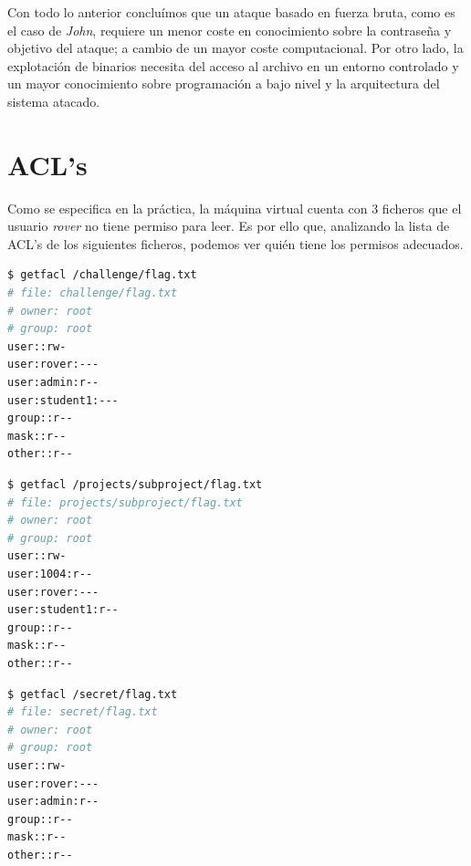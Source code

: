 \documentclass[]{article}
\begin{document}
Con todo lo anterior concluímos que un ataque basado en fuerza bruta, como es el caso de \textit{John}, requiere un menor coste en conocimiento sobre la contraseña y objetivo del ataque; a cambio de un mayor coste computacional. Por otro lado, la explotación de binarios necesita del acceso al archivo en un entorno controlado y un mayor conocimiento sobre programación a bajo nivel y la arquitectura del sistema atacado.

\section{ACL's}
\label{sec:acl}
Como se especifica en la práctica, la máquina virtual cuenta con 3 ficheros que el usuario \textit{rover} no tiene permiso para leer. Es por ello que, analizando la lista de ACL's de los siguientes ficheros, podemos ver quién tiene los permisos adecuados.

\vspace{0.5cm}

\begin{minipage}{\textwidth}
\begin{minipage}[t]{0.3\textwidth}
\begin{lstlisting}[showlines=true,language=bash]
$ getfacl /challenge/flag.txt
# file: challenge/flag.txt
# owner: root
# group: root
user::rw-
user:rover:---
user:admin:r--
user:student1:---
group::r--
mask::r--
other::r--


\end{lstlisting}
\end{minipage}
\begin{minipage}[t]{0.3\textwidth}
\begin{lstlisting}[language=bash]
$ getfacl /projects/subproject/flag.txt
# file: projects/subproject/flag.txt
# owner: root
# group: root
user::rw-
user:1004:r--
user:rover:---
user:student1:r--
group::r--
mask::r--
other::r--

\end{lstlisting}
\end{minipage}
\begin{minipage}[t]{0.3\textwidth}
\begin{lstlisting}[showlines=true, language=bash]
$ getfacl /secret/flag.txt
# file: secret/flag.txt
# owner: root
# group: root
user::rw-
user:rover:---
user:admin:r--
group::r--
mask::r--
other::r--



\end{lstlisting}
\end{minipage}
\end{minipage}
\end{document}

